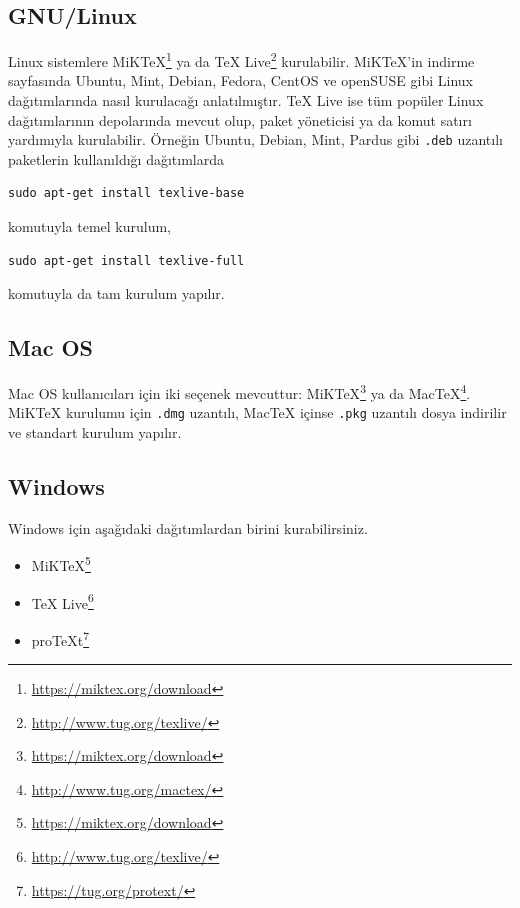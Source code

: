 \documentclass[
  10pt,
]{scrbook}
\providecommand{\tightlist}{%
  \setlength{\itemsep}{0pt}\setlength{\parskip}{0pt}}
\renewcommand{\href}[2]{#2\footnote{\url{#1}}}
\theoremstyle{definition}
\theoremstyle{definition}
\theoremstyle{definition}
\theoremstyle{definition}
\theoremstyle{remark}
\begin{document}
\hypertarget{gnulinux}{%
\subsection{GNU/Linux}\label{gnulinux}}

Linux sistemlere \href{https://miktex.org/download}{MiKTeX} ya da \href{http://www.tug.org/texlive/}{TeX Live} kurulabilir. MiKTeX'in indirme sayfasında Ubuntu, Mint, Debian, Fedora, CentOS ve openSUSE gibi Linux dağıtımlarında nasıl kurulacağı anlatılmıştır. TeX Live ise tüm popüler Linux dağıtımlarının depolarında mevcut olup, paket yöneticisi ya da komut satırı yardımıyla kurulabilir. Örneğin Ubuntu, Debian, Mint, Pardus gibi \texttt{.deb} uzantılı paketlerin kullanıldığı dağıtımlarda

\begin{verbatim}
sudo apt-get install texlive-base
\end{verbatim}

komutuyla temel kurulum,

\begin{verbatim}
sudo apt-get install texlive-full
\end{verbatim}

komutuyla da tam kurulum yapılır.

\hypertarget{mac-os}{%
\subsection{Mac OS}\label{mac-os}}

Mac OS kullanıcıları için iki seçenek mevcuttur: \href{https://miktex.org/download}{MiKTeX} ya da \href{http://www.tug.org/mactex/}{MacTeX}. MiKTeX kurulumu için \texttt{.dmg} uzantılı, MacTeX içinse \texttt{.pkg} uzantılı dosya indirilir ve standart kurulum yapılır.

\hypertarget{windows}{%
\subsection{Windows}\label{windows}}

Windows için aşağıdaki dağıtımlardan birini kurabilirsiniz.

\begin{itemize}
\tightlist
\item
  \href{https://miktex.org/download}{MiKTeX}
\item
  \href{http://www.tug.org/texlive/}{TeX Live}
\item
  \href{https://tug.org/protext/}{proTeXt}
\end{itemize}
\end{document}

